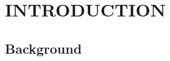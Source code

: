 \section{INTRODUCTION}


\subsection{Background}

%
\begin{comment}
INSTRUCTIONS FOR WRITING A MASTER'S THESIS

The goal of this report is to give instructions how to write a master’s thesis. The report is
only an outline, a model which will be extended according to the contents of the actual
work for the thesis. For more information, read “Final thesis instructions” in the study
guide, discuss with your supervisor, visit appropriate course web pages, see for example
[1]. When you are referring to pages in the World Wide Web, see the instruction for citing
and referencing from the LUT Library web site. Do not use footnotes or do not write URLs
within the text.

Introduction contains three subsections: background, goals and delimitations, and
description of the structure of the thesis. Use this sectioning. Subsection 1.1 includes an
introduction to the background for the work. Remember that the abstract is a separate
piece of text. The introduction should be written independently such that one does not need
to read the abstract to understand the introduction. The introduction is written in a general
level instead of many details present. These details will be explained later starting from
section 2. The paragraphs have more than only one sentence. In the thesis, this subsection
occupies from 1 to 2 pages.

Remember to introduce the abbreviations when they are used in the text for the first time.
For example: ”This thesis is about the games played in National Hockey League (NHL) in
seasons 1900-2000. The annual penalties in NHL have ... “.

The introduction is written such that the reader is interested to continue to read the full
thesis. And if this interest is arisen then the author is ready to give some general
descriptions for the contents of the thesis and reading guidelines for the rest of the text in
the thesis.

\end{comment}

